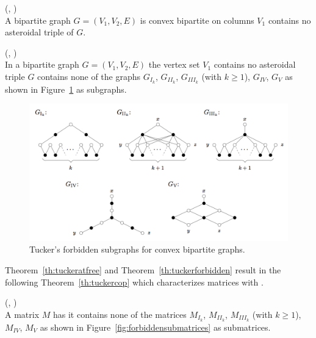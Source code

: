 \begin{theorem}
  (\cite[Th.~6]{at72}, \cite[Th.~2.3]{d08phd})\\
  A bipartite graph $G = (V_1, V_2, E)$ is convex bipartite on
  columns \iff $V_1$ contains no asteroidal
  triple of $G$.
  \label{th:tuckeratfree}
\end{theorem}

\begin{theorem}
  (\cite[Th.~7]{at72}, \cite[Th.~2.4]{d08phd})\\
  In a bipartite graph $G = (V_1, V_2, E)$ the vertex set $V_1$
  contains no asteroidal triple \iff $G$ contains none of the graphs
  $G_{I_k}$, $G_{II_k}$, $G_{III_k}$ (with $k \ge 1$), $G_{IV}$,
  $G_{V}$ as shown in Figure~\ref{fig:forbiddensubgraphs} as subgraphs.
  \label{th:tuckerforbidden}
\end{theorem}


\begin{figure}[htbp]
  \centering
  \includegraphics[scale=0.35]{../img/tuckersforbiddensubgraphs.png}  
  \caption[\figtabsize Tucker's forbidden subgraphs]{\figtabsize Tucker's
    forbidden subgraphs for convex bipartite graphs. } 
  \label{fig:forbiddensubgraphs}
\end{figure}

Theorem~\ref{th:tuckeratfree} and Theorem~\ref{th:tuckerforbidden}
result in the following Theorem~\ref{th:tuckercop} which characterizes
matrices with \COP.

\begin{theorem}
  (\cite[Th.~9]{at72}, \cite[Th.~2.5]{d08phd})\\
  A matrix $M$ has \COP \iff it contains none of the matrices 
$M_{I_k}$, $M_{II_k}$, $M_{III_k}$ (with $k \ge 1$), $M_{IV}$,
  $M_{V}$ as shown in Figure~\ref{fig:forbiddensubmatrices} as submatrices.
  \label{th:tuckercop}
\end{theorem}


